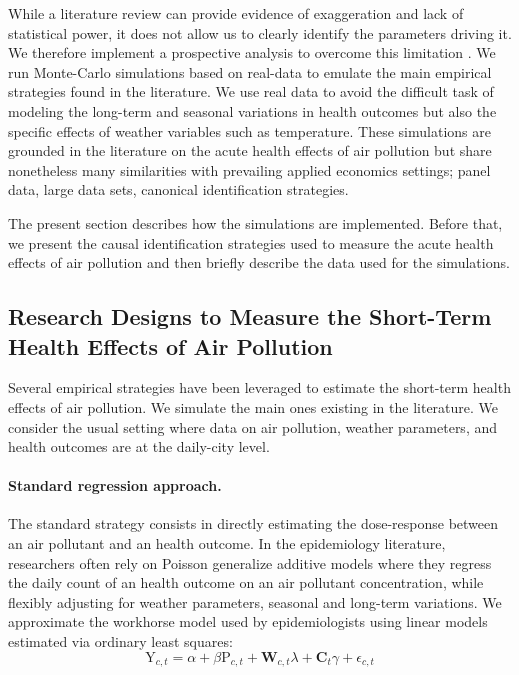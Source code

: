 \documentclass[12pt]{article}
\begin{document}
    While a literature review can provide evidence of exaggeration and lack of statistical power, it does not allow us to clearly identify the parameters driving it. We therefore implement a prospective analysis to overcome this limitation \citep[for other examples of power simulations]{altoe_enhancing_2020, black_simulated_2022}. We run Monte-Carlo simulations based on real-data to emulate the main empirical strategies found in the literature. We use real data to avoid the difficult task of modeling the long-term and seasonal variations in health outcomes but also the specific effects of weather variables such as temperature. These simulations are grounded in the literature on the acute health effects of air pollution but share nonetheless many similarities with prevailing applied economics settings; panel data, large data sets, canonical identification strategies.
    
    The present section describes how the simulations are implemented. Before that, we present the causal identification strategies used to measure the acute health effects of air pollution and then briefly describe the data used for the simulations.
        
    \subsection{Research Designs to Measure the Short-Term Health Effects of Air Pollution}
        
        Several empirical strategies have been leveraged to estimate the short-term health effects of air pollution. We simulate the main ones existing in the literature. We consider the usual setting where data on air pollution, weather parameters, and health outcomes are at the daily-city level.
        
        \begin{sloppypar}
        \paragraph{Standard regression approach.} The standard strategy consists in directly estimating the dose-response between an air pollutant and an health outcome. In the epidemiology literature, researchers often rely on Poisson generalize additive models where they regress the daily count of an health outcome on an air pollutant concentration, while flexibly adjusting for weather parameters, seasonal and long-term variations. We approximate the workhorse model used by epidemiologists using linear models estimated via ordinary least squares:
        ~
        \begin{equation}
            \text{Y}_{c,t} = \alpha + \beta\text{P}_{c,t} + \textbf{W}_{c,t}\lambda + \textbf{C}_{t}\gamma + \epsilon_{c,t}
        \end{equation}
        \end{sloppypar}
        
\end{document}
